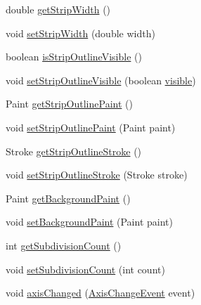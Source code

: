 \begin{DoxyCompactItemize}
\item 
double \mbox{\hyperlink{classorg_1_1jfree_1_1chart_1_1title_1_1_paint_scale_legend_a4fa181b733f23975b9edfc1b50c864a8}{get\+Strip\+Width}} ()
\item 
void \mbox{\hyperlink{classorg_1_1jfree_1_1chart_1_1title_1_1_paint_scale_legend_a0b5b9e831a8f985969497cf9779beea4}{set\+Strip\+Width}} (double width)
\item 
boolean \mbox{\hyperlink{classorg_1_1jfree_1_1chart_1_1title_1_1_paint_scale_legend_a5d129b2bb0ce2b552e36760a01ab1355}{is\+Strip\+Outline\+Visible}} ()
\item 
void \mbox{\hyperlink{classorg_1_1jfree_1_1chart_1_1title_1_1_paint_scale_legend_a573a98df421a6e4a200e0286a608be8c}{set\+Strip\+Outline\+Visible}} (boolean \mbox{\hyperlink{classorg_1_1jfree_1_1chart_1_1title_1_1_title_a8f9f60ec3aba4b287ca8cd9c591cd179}{visible}})
\item 
Paint \mbox{\hyperlink{classorg_1_1jfree_1_1chart_1_1title_1_1_paint_scale_legend_a36458115671fefe01a989b77fad034d8}{get\+Strip\+Outline\+Paint}} ()
\item 
void \mbox{\hyperlink{classorg_1_1jfree_1_1chart_1_1title_1_1_paint_scale_legend_a1362e27da5a7d168bb17453aa41dd14f}{set\+Strip\+Outline\+Paint}} (Paint paint)
\item 
Stroke \mbox{\hyperlink{classorg_1_1jfree_1_1chart_1_1title_1_1_paint_scale_legend_af735d5472f8cf21e1e07b7a1d5a5fe53}{get\+Strip\+Outline\+Stroke}} ()
\item 
void \mbox{\hyperlink{classorg_1_1jfree_1_1chart_1_1title_1_1_paint_scale_legend_aa72881dc0321ee1d773943e170b60d62}{set\+Strip\+Outline\+Stroke}} (Stroke stroke)
\item 
Paint \mbox{\hyperlink{classorg_1_1jfree_1_1chart_1_1title_1_1_paint_scale_legend_a97dce120273496002e0329f0ec745f6f}{get\+Background\+Paint}} ()
\item 
void \mbox{\hyperlink{classorg_1_1jfree_1_1chart_1_1title_1_1_paint_scale_legend_a446bbca0729d3d555b6f5ae4b9d941fb}{set\+Background\+Paint}} (Paint paint)
\item 
int \mbox{\hyperlink{classorg_1_1jfree_1_1chart_1_1title_1_1_paint_scale_legend_a0aa4c63fab33da8ae08e4868e8a4c7a7}{get\+Subdivision\+Count}} ()
\item 
void \mbox{\hyperlink{classorg_1_1jfree_1_1chart_1_1title_1_1_paint_scale_legend_a0206fdb568b6dfc6a6c43ec5d874744c}{set\+Subdivision\+Count}} (int count)
\item 
void \mbox{\hyperlink{classorg_1_1jfree_1_1chart_1_1title_1_1_paint_scale_legend_a71b207d9716dc46b726ebae0282ce0a8}{axis\+Changed}} (\mbox{\hyperlink{classorg_1_1jfree_1_1chart_1_1event_1_1_axis_change_event}{Axis\+Change\+Event}} event)

\end{DoxyCompactItemize}
